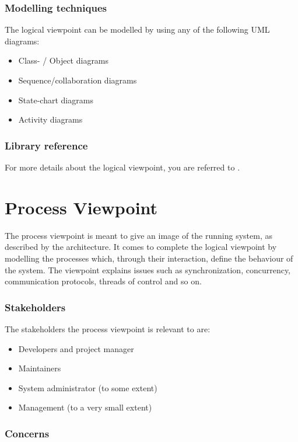 \subsubsection{Modelling techniques}
The logical viewpoint can be modelled by using any of the following UML diagrams:
\begin{itemize}
\item Class- / Object diagrams
\item Sequence/collaboration diagrams
\item State-chart diagrams
\item Activity diagrams
\end{itemize}

\subsubsection{Library reference}
For more details about the logical viewpoint, you are referred to \cite{kru95}.

\section{Process Viewpoint}

The process viewpoint is meant to give an image of the running system, as described by
the architecture. It comes to complete the logical viewpoint by modelling the processes
which, through their interaction, define the behaviour of the system. The viewpoint explains
issues such as synchronization, concurrency, communication protocols, threads of control
and so on.

\subsubsection{Stakeholders}

The stakeholders the process viewpoint is relevant to are:

\begin{itemize}
\item Developers and project manager
\item Maintainers
\item System administrator (to some extent)
\item Management (to a very small extent)
\end{itemize}

\subsubsection{Concerns}

